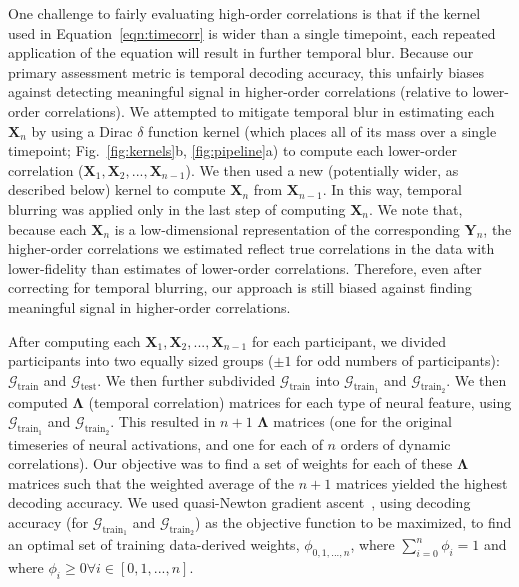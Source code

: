 \documentclass[english]{article}
\begin{document}
One challenge to fairly evaluating high-order correlations is that if
the kernel used in Equation~\ref{eqn:timecorr} is wider than a single
timepoint, each repeated application of the equation will result in
further temporal blur.  Because our primary assessment metric is
temporal decoding accuracy, this unfairly biases against detecting
meaningful signal in higher-order correlations (relative to
lower-order correlations).  We attempted to mitigate temporal blur in
estimating each $\mathbf{X}_n$ by using a Dirac $\delta$ function
kernel (which places all of its mass over a single timepoint;
Fig.~\ref{fig:kernels}b, \ref{fig:pipeline}a) to compute each lower-order correlation
($\mathbf{X}_1, \mathbf{X}_2, ..., \mathbf{X}_{n-1}$).  We then used a
new (potentially wider, as described below) kernel to compute
$\mathbf{X}_{n}$ from $\mathbf{X}_{n-1}$.  In this way, temporal
blurring was applied only in the last step of computing
$\mathbf{X}_n$.  We note that, because each $\mathbf{X}_n$ is a
low-dimensional representation of the corresponding $\mathbf{Y}_n$,
the higher-order correlations we estimated reflect true correlations
in the data with lower-fidelity than estimates of lower-order
correlations.  Therefore, even after correcting for temporal blurring,
our approach is still biased against finding meaningful signal in
higher-order correlations.

After computing each
$\mathbf{X}_1, \mathbf{X}_2, ..., \mathbf{X}_{n-1}$ for each
participant, we divided participants into two equally sized groups
($\pm 1$ for odd numbers of participants):
$\mathcal{G}_{\mathrm{train}}$ and $\mathcal{G}_{\mathrm{test}}$.  We
then further subdivided $\mathcal{G}_{\mathrm{train}}$ into
$\mathcal{G}_{\mathrm{train}_1}$ and $\mathcal{G}_{\mathrm{train}_2}$.
We then computed $\mathbf{\Lambda}$ (temporal correlation) matrices
for each type of neural feature, using
$\mathcal{G}_{\mathrm{train}_1}$ and $\mathcal{G}_{\mathrm{train}_2}$.
This resulted in $n+1$ $\mathbf{\Lambda}$ matrices (one for the
original timeseries of neural activations, and one for each of $n$
orders of dynamic correlations).  Our objective was to find a set of
weights for each of these $\mathbf{\Lambda}$ matrices such that the
weighted average of the $n+1$ matrices yielded the highest decoding
accuracy.  We used quasi-Newton gradient ascent~\citep{NoceWrig06},
using decoding accuracy (for $\mathcal{G}_{\mathrm{train}_1}$ and
$\mathcal{G}_{\mathrm{train}_2}$) as the objective function to be
maximized, to find an optimal set of training data-derived weights,
$\phi_{0, 1, ..., n}$, where $\sum_{i=0}^n \phi_i = 1$ and where
$\phi_i \geq 0 \forall i \in \left[0, 1, ..., n\right]$.
\end{document}

